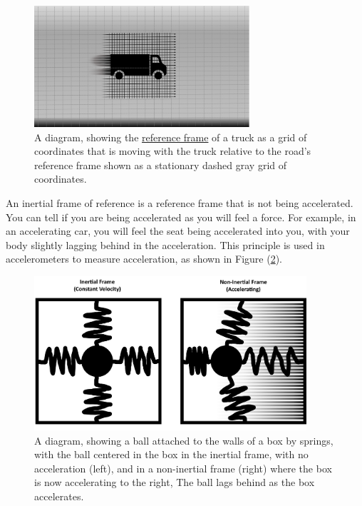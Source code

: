 \begin{figure}[H]
	\centering
	\includegraphics[width = 8cm]{images/pdf/Reference_Frames_of_truck_and_road.pdf}
	\caption{A diagram, showing the \protect\hyperlink{def-Reference-frame}{reference frame} of a truck as a grid of coordinates that is moving with the truck relative to the road's reference frame shown as a stationary dashed gray grid of coordinates.}
	\label{fig: Reference Frames}
\end{figure}

An inertial frame of reference is a reference frame that is not being accelerated.
You can tell if you are being accelerated as you will feel a force.
For example, in an accelerating car, you will feel the seat being accelerated into you, with your body slightly lagging behind in the acceleration.
This principle is used in accelerometers to measure acceleration, as shown in Figure (\ref{fig: spring boxes}).

\begin{figure}[H]
	\centering
	\includegraphics[width = 0.9\textwidth]{images/pdf/Spring_boxes.pdf}
	\caption{A diagram, showing a ball attached to the walls of a box by springs, with the ball centered in the box in the inertial frame, with no acceleration (left), and in a non-inertial frame (right) where the box is now accelerating to the right, The ball lags behind as the box accelerates.}
	\label{fig: spring boxes}
\end{figure}


